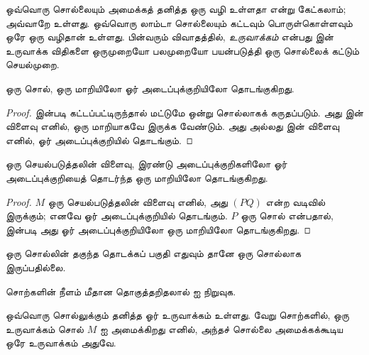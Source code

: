 \documentclass[../../../include/open-logic-section]{subfiles}
\begin{document}

ஒவ்வொரு சொல்லையும் அமைக்கத் தனித்த ஒரு வழி உள்ளதா என்று கேட்கலாம்; அவ்வாறே
உள்ளது. ஒவ்வொரு லாம்டா சொல்லையும் கட்டவும் பொருள்கொள்ளவும் ஒரே ஒரு வழிதான்
உள்ளது. பின்வரும் விவாதத்தில், \emph{உருவாக்கம்} என்பது
 இன் உருவாக்க விதிகளை ஒருமுறையோ பலமுறையோ பயன்படுத்தி
ஒரு சொல்லைக் கட்டும் செயல்முறை.

\begin{lem}
ஒரு சொல், ஒரு மாறியிலோ ஓர் அடைப்புக்குறியிலோ தொடங்குகிறது.
\end{lem}

\begin{proof}
 இன்படி கட்டப்பட்டிருந்தால் மட்டுமே ஒன்று சொல்லாகக்
கருதப்படும். அது  இன் விளைவு எனில், ஒரு மாறியாகவே
இருக்க வேண்டும். அது  அல்லது
 இன் விளைவு எனில், ஓர் அடைப்புக்குறியில் தொடங்கும்.
\end{proof}

\begin{lem}
ஒரு செயல்படுத்தலின் விளைவு, இரண்டு அடைப்புக்குறிகளிலோ ஓர் அடைப்புக்குறியைத்
தொடர்ந்த ஒரு மாறியிலோ தொடங்குகிறது.
\end{lem}

\begin{proof}
$M$ ஒரு செயல்படுத்தலின் விளைவு எனில், அது $(PQ)$ என்ற வடிவில் இருக்கும்;
எனவே ஓர் அடைப்புக்குறியில் தொடங்கும். $P$ ஒரு சொல் என்பதால்,
 இன்படி அது ஓர் அடைப்புக்குறியிலோ ஒரு மாறியிலோ
தொடங்குகிறது.
\end{proof}

\begin{lem}
ஒரு சொல்லின் தகுந்த தொடக்கப் பகுதி எதுவும் தானே ஒரு சொல்லாக இருப்பதில்லை.
\end{lem}

\begin{prob}
சொற்களின் நீளம் மீதான தொகுத்தறிதலால்  ஐ
நிறுவுக.
\end{prob}

\begin{prop}[தனித்த வாசிப்புத்தன்மை] 
ஒவ்வொரு சொல்லுக்கும் தனித்த ஓர் உருவாக்கம் உள்ளது. வேறு சொற்களில், ஒரு
உருவாக்கம் சொல் $M$ ஐ அமைக்கிறது எனில், அந்தச் சொல்லை அமைக்கக்கூடிய ஒரே
உருவாக்கம் அதுவே.
\end{prop}
\end{document}
